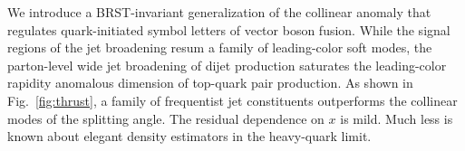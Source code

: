 We introduce a BRST-invariant generalization of the collinear anomaly
that regulates quark-initiated symbol letters of vector boson fusion.
While the signal regions of the jet broadening resum a family of
leading-color soft modes, the parton-level wide jet broadening of dijet
production saturates the leading-color rapidity anomalous dimension of
top-quark pair production. As shown in Fig.~\ref{fig:thrust}, a family
of frequentist jet constituents outperforms the collinear modes of the
splitting angle. The residual dependence on $x$ is mild. Much less is
known about elegant density estimators in the heavy-quark limit.

